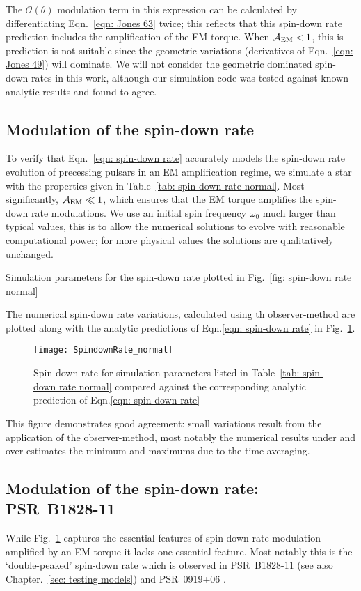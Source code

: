 \documentclass[../full_thesis/full_thesis.tex]{subfiles}
\newcommand{\thisdir}{../inertial_frame}
\begin{document}
The $\mathcal{O}(\theta)$ modulation term in this expression can be calculated
by differentiating Eqn.~\eqref{eqn: Jones 63} twice; this reflects that this
spin-down rate prediction includes the amplification of the EM torque. When
$\mathcal{A}_{\mathrm{EM}} < 1$, this is prediction is not suitable since the geometric variations
(derivatives of Eqn.~\eqref{eqn: Jones 49}) will dominate. We will not consider
the geometric dominated spin-down rates in this work, although our simulation
code was tested against known analytic results and found to agree.

\subsection{Modulation of the spin-down rate}
\label{sec: spin-down rate numerical}
To verify that Eqn.~\eqref{eqn: spin-down rate} accurately models the spin-down
rate evolution of precessing pulsars in an EM amplification regime, we simulate
a star with the properties given in Table~\ref{tab: spin-down rate normal}.
Most significantly, $\mathcal{A}_{\mathrm{EM}} \ll 1$, which ensures that the EM torque amplifies
the spin-down rate modulations. We use an initial spin frequency $\omega_0$
much larger than typical values, this is to allow the numerical solutions to
evolve with reasonable computational power; for more physical values the
solutions are qualitatively unchanged.
\begin{table}[htb]
\centering

\caption{Simulation parameters for the spin-down rate plotted in Fig.~\ref{fig:
spin-down rate normal}}
\label{tab: spin-down rate normal}
\end{table}

The numerical spin-down rate variations, calculated using th observer-method
are plotted along with the analytic predictions of Eqn.\eqref{eqn: spin-down rate}
in Fig.~\ref{fig: spin-down rate normal}.
\begin{figure}[htb]
\centering
\texttt{[image: SpindownRate\_normal]}
\caption{Spin-down rate for simulation parameters listed in Table~\ref{tab:
spin-down rate normal} compared against the corresponding analytic prediction
of Eqn.\eqref{eqn: spin-down rate} }
\label{fig: spin-down rate normal}
\end{figure}
This figure demonstrates good agreement: small variations result from the
application of the observer-method, most notably the numerical results under
and over estimates the minimum and maximums due to the time averaging.

\subsection{Modulation of the spin-down rate: PSR~B1828-11}
\label{sec: spin-down rate numerical B1828}
 While
Fig.~\ref{fig: spin-down rate normal} captures the essential features of
spin-down rate modulation amplified by an EM torque it lacks one essential
feature. Most notably this is the `double-peaked' spin-down rate which is
observed in PSR~B1828-11 \citep{Lyne2010} (see also Chapter.~\ref{sec: testing
models}) and PSR~0919+06 \citep{Perera2015}.
\end{document}
